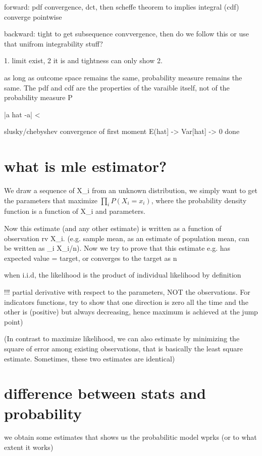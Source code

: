 {{{{{{{{{{forward: pdf convergence, dct, then scheffe theorem to implies integral (cdf) converge pointwise

backward: tight to get subsequence convvergence, then do we follow this or use that unifrom integrability stuff?


1. limit exist, 2 it is \mu and \sigma
tightness can only show 2.



as long as outcome space remains the same, probability measure remains the same. The pdf and cdf are the properties of the varaible itself, not of the probability measure P

|a hat -a| < \epsilon


slusky/chebyshev
convergence of first moment E(\lambda hat] -> \lambda
Var[\lambda hat] -> 0
done


\section*{what is mle estimator?}
We draw a sequence of X_i from an unknown distribution, we simply want to get the parameters that maximize $\prod_i P(X_i = x_i)$, where the probability density function is a function of X_i and parameters.

Now this estimate (and any other estimate) is written as a function of observation rv  X_i. (e.g. sample mean, as an estimate of population mean, can be written as \sum_i X_i/n). Now we try to prove that this estimate e.g. has expected value = target, or converges to the target as n \to \infty


when i.i.d, the likelihood is the product of individual likelihood by definition

!!! partial derivative with respect to the parameters, NOT the observations. For indicators functions, try to show that one direction is zero all the time and the other is (positive) but always decreasing, hence maximum is achieved at the jump point)

(In contrast to maximize likelihood, we can also estimate by minimizing the square of error among existing observations, that is basically the least square estimate. Sometimes, these two estimates are identical)


\section*{difference between stats and probability}
we obtain some estimates that shows us the probabilitic model wprks (or to what extent it works)

}}}}}}}}}}
